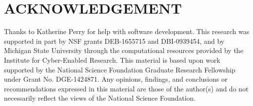 \section*{ACKNOWLEDGEMENT}


Thanks to Katherine Perry for help with software development.
This research was supported in part by NSF grants DEB-1655715 and DBI-0939454, and by Michigan State University through the computational resources provided by the Institute for Cyber-Enabled Research.
This material is based upon work supported by the National Science Foundation Graduate Research Fellowship under Grant No. DGE-1424871.
Any opinions, findings, and conclusions or recommendations expressed in this material are those of the author(s) and do not necessarily reflect the views of the National Science Foundation.